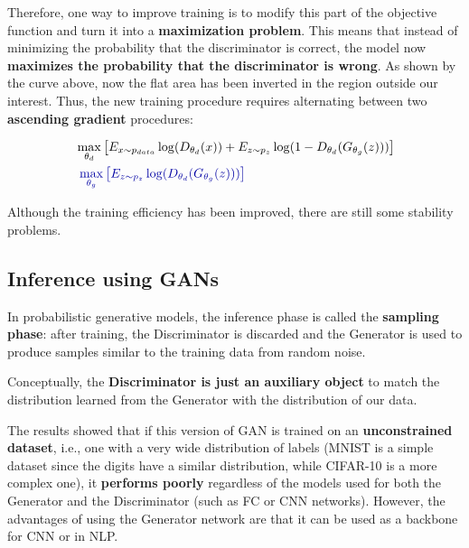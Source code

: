 Therefore, one way to improve training is to modify this part of the objective function and turn it into a \textbf{maximization problem}. This means that instead of minimizing the probability that the discriminator is correct, the model now \textbf{maximizes the probability that the discriminator is wrong}. As shown by the curve above, now the flat area has been inverted in the region outside our interest. Thus, the new training procedure requires alternating between two \textbf{ascending gradient} procedures:

\vspace{-0.5cm}
{\Large
\begin{equation*}
\begin{aligned}
    &\max_{\theta_{d}} \left[E_{x \sim p_{data}} \log (D_{\theta_{d}}(x)) + E_{z \sim p_{z}} \log (1 - D_{\theta_{d}}(G_{\theta_{g}}(z))) \right] \\
    &\ \textcolor{mybluee}{{\max_{\theta_{g}} \left[E_{z \sim p_{z}} \log (D_{\theta_{d}}(G_{\theta_{g}}(z))) \right]}}
\end{aligned}
\end{equation*}
}

Although the training efficiency has been improved, there are still some stability problems.

\subsection{Inference using GANs}
In probabilistic generative models, the inference phase is called the \textbf{sampling phase}: after training, the Discriminator is discarded and the Generator is used to produce samples similar to the training data from random noise.

Conceptually, the \textbf{Discriminator is just an auxiliary object} to match the distribution learned from the Generator with the distribution of our data.

The results showed that if this version of GAN is trained on an \textbf{unconstrained dataset}, i.e., one with a very wide distribution of labels (MNIST is a simple dataset since the digits have a similar distribution, while CIFAR-10 is a more complex one), it \textbf{performs poorly} regardless of the models used for both the Generator and the Discriminator (such as FC or CNN networks). However, the advantages of using the Generator network are that it can be used as a backbone for CNN or in NLP.

